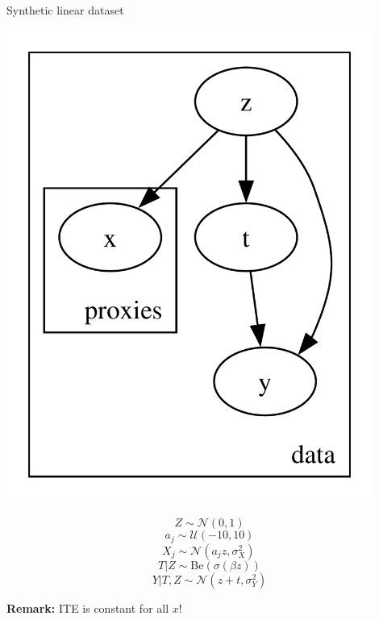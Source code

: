 \documentclass[10pt]{beamer}
\begin{document}
\begin{frame}{Synthetic linear dataset}
    \begin{minipage}{0.48\textwidth}
      \includegraphics[width=0.9\textwidth]{images/pyro_model.pdf}
    \end{minipage}
    \begin{minipage}{0.48\textwidth}
        \begin{equation*}
        Z \sim \mathcal{N}(0,1)
        \end{equation*}
        \begin{equation*}
             a_j \sim \mathcal{U}(-10,10)
        \end{equation*}
        \begin{equation*}
        X_j \sim \mathcal{N}(a_j z,\sigma_X^2)\,    
        \end{equation*}
        \begin{equation*}
        T | Z \sim \mathrm{Be}(\sigma(\beta z))    
        \end{equation*}
        \small{\begin{equation*}
        Y|T,Z \sim \mathcal{N}(z + t, \sigma_Y^2)            
        \end{equation*}}
      \end{minipage}
      \centering
      {\textbf{Remark:} ITE is constant for all  $x$!}
\end{frame}
\end{document}
